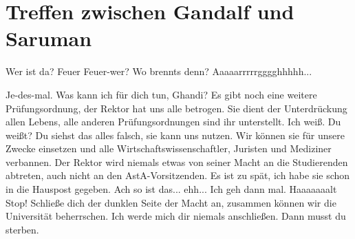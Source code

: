 
\newpage
\section{Treffen zwischen Gandalf und Saruman}
\label{sec:gandalf-saruman}
    \charaktere{\Gandalf, \Saruman }
    

\begin{verseplay}[10em]
\s{\Saruman} Wer ist da?
\s{\Gandalf} Feuer
\s{\Saruman} Feuer-wer?
\s{\Gandalf}  Wo brennts denn?
\s{\Saruman} Aaaaarrrrrgggghhhhh... 
\end{verseplay}
\begin{verseplay}[10em]
\s{\Saruman} Je-des-mal. Was kann ich für dich tun, Ghandi?
\s{\Gandalf} Es gibt noch eine weitere Prüfungsordnung, der Rektor hat uns alle betrogen. Sie dient der Unterdrückung allen Lebens, alle anderen Prüfungsordnungen sind ihr unterstellt.
\s{\Saruman} Ich weiß.
\s{\Gandalf}  Du weißt?
\s{\Saruman} Du siehst das alles falsch, sie kann uns nutzen. Wir können sie für unsere Zwecke einsetzen und alle Wirtschaftswissenschaftler, Juristen und Mediziner verbannen.
\s{\Gandalf} Der Rektor wird niemals etwas von seiner Macht an die Studierenden abtreten, auch nicht an den AstA-Vorsitzenden.
\s{\Saruman} Es ist zu spät, ich habe sie schon in die Hauspost gegeben.
\s{\Gandalf} Ach so ist das... ehh... Ich geh dann mal.
\s{\Saruman} Haaaaaaalt Stop! Schließe dich der dunklen Seite der Macht an, zusammen können wir die Universität beherrschen.
\s{\Gandalf} Ich werde mich dir niemals anschließen.
\s{\Saruman} Dann musst du sterben.
\end{verseplay}


